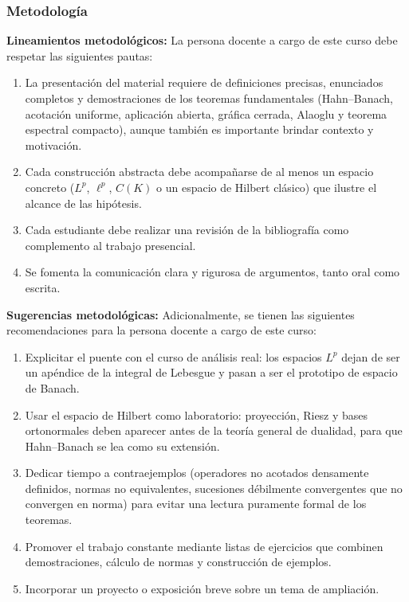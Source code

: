 \begin{refsection}
\begin{enumerate}
\end{enumerate}

\subsubsection*{Metodología}

\noindent \textbf{Lineamientos metodológicos:} La persona docente a cargo de este curso debe respetar las siguientes pautas:
\begin{enumerate}
    \item La presentación del material requiere de definiciones precisas, enunciados completos y demostraciones de los teoremas fundamentales (Hahn--Banach, acotación uniforme, aplicación abierta, gráfica cerrada, Alaoglu y teorema espectral compacto), aunque también es importante brindar contexto y motivación.
    \item Cada construcción abstracta debe acompañarse de al menos un espacio concreto ($L^p$, $\ell^p$, $C(K)$ o un espacio de Hilbert clásico) que ilustre el alcance de las hipótesis.
    \item Cada estudiante debe realizar una revisión de la bibliografía como complemento al trabajo presencial.
    \item Se fomenta la comunicación clara y rigurosa de argumentos, tanto oral como escrita.
\end{enumerate}

\textbf{Sugerencias metodológicas:} Adicionalmente, se tienen las siguientes recomendaciones para la persona docente a cargo de este curso:
\begin{enumerate}
    \item Explicitar el puente con el curso de análisis real: los espacios $L^p$ dejan de ser un apéndice de la integral de Lebesgue y pasan a ser el prototipo de espacio de Banach.
    \item Usar el espacio de Hilbert como laboratorio: proyección, Riesz y bases ortonormales deben aparecer antes de la teoría general de dualidad, para que Hahn--Banach se lea como su extensión.
    \item Dedicar tiempo a contraejemplos (operadores no acotados densamente definidos, normas no equivalentes, sucesiones débilmente convergentes que no convergen en norma) para evitar una lectura puramente formal de los teoremas.
    \item Promover el trabajo constante mediante listas de ejercicios que combinen demostraciones, cálculo de normas y construcción de ejemplos.
    \item Incorporar un proyecto o exposición breve sobre un tema de ampliación.
\end{enumerate}



\end{refsection}
